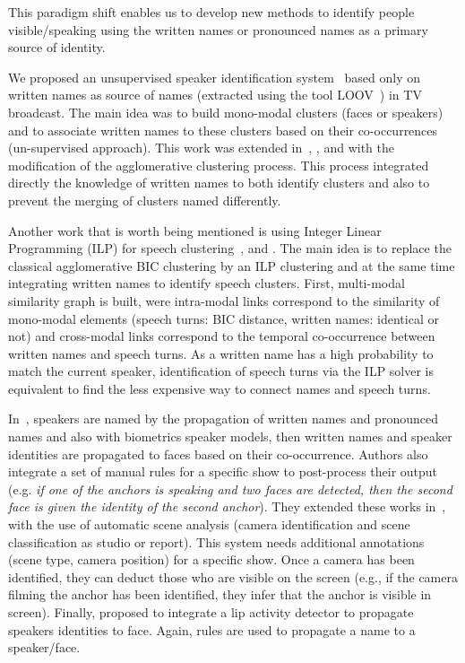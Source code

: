 \documentclass{acm_proc_article-me}
\begin{document}
This paradigm shift enables us to develop new methods to identify people visible/speaking using the written names or pronounced names as a primary source of identity.

We proposed an unsupervised speaker identification system~\cite{POIGNANT--INTERSPEECH--2012} based only on written names as source of names (extracted using the tool LOOV~\cite{POIGNANT--ICME--2012}) in TV broadcast. The main idea was to build mono-modal clusters (faces or speakers) and to associate written names to these clusters based on their co-occurrences (un-supervised approach). This work was extended in~\cite{BREDIN--SLAM--2013}, \cite{POIGNANT--SLAM--2013}, \cite{POIGNANT--ASLP--2015} and \cite{POIGNANT--MTAP--2015} with the modification of the agglomerative clustering process. This process integrated directly the knowledge of written names to both identify clusters and also to prevent the merging of clusters named differently.

Another work that is worth being mentioned is using Integer Linear Programming (ILP) for speech clustering~\cite{BREDIN--INTERSPEECH--2013}, \cite{BREDIN--IJMIR--2014} and \cite{BREDIN--ODYSSEY--2014}. The main idea is to replace the classical agglomerative BIC clustering by an ILP clustering and at the same time integrating written names to identify speech clusters. First, multi-modal similarity graph is built, were intra-modal links correspond to the similarity of mono-modal elements (speech turns: BIC distance, written names: identical or not) and cross-modal links correspond to the temporal co-occurrence between written names and speech turns. As a written name has a high probability to match the current speaker, identification of speech turns via the ILP solver is equivalent to find the less expensive way to connect names and speech turns.

In~\cite{FAVRE--SLAM--2013}, speakers are named by the propagation of written names and pronounced names and also with biometrics speaker models, then written names and speaker identities are propagated to faces based on their co-occurrence. Authors also integrate a set of manual rules for a specific show to post-process their output (e.g. \textit{if one of the anchors is speaking and two faces are detected, then the second face is given the identity of the second anchor}). They extended these works in~\cite{BECHET--INTERSPEECH--2014}, \cite{ROUVIER--CBMI--2014} with the use of automatic scene analysis (camera identification and scene classification as studio or report). This system needs additional annotations (scene type, camera position) for a specific show. Once a camera has been identified, they can deduct those who are visible on the screen (e.g., if the camera filming the anchor has been identified, they infer that the anchor is visible in screen). Finally, \cite{BENDRIS--CBMI--2013} proposed to integrate a lip activity detector to propagate speakers identities to face. Again, rules are used to propagate a name to a speaker/face.
\end{document}
